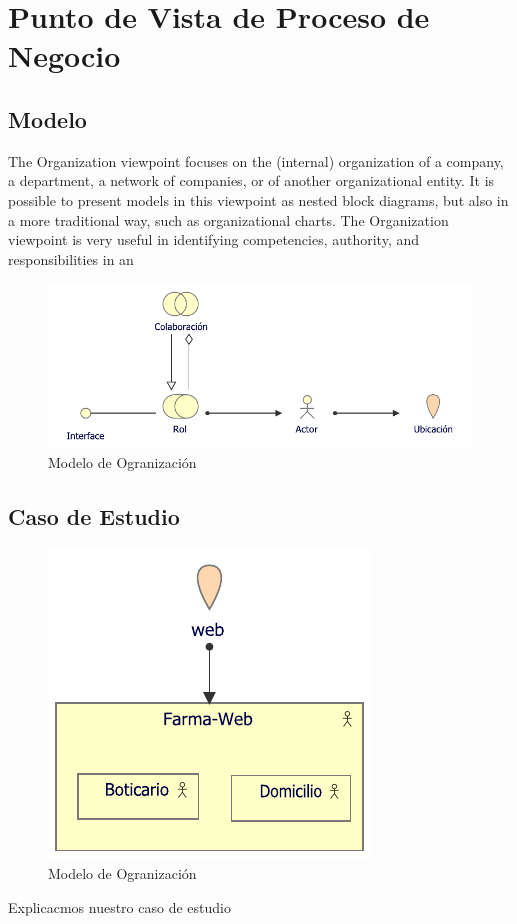 \section{Punto de Vista de Proceso de Negocio}
\subsection{Modelo}
The Organization viewpoint focuses on the (internal) organization of a company, a department, a network of companies, or of another organizational entity. It is possible to present models in this viewpoint as nested block diagrams, but also in a more traditional way, such as organizational charts. The Organization viewpoint is very useful in identifying competencies, authority, and responsibilities in an

\begin{figure}[h!]
	\centering
	\includegraphics[width=1\linewidth]{ARQUITECTURA/imgs/MOrganizacion}
	\caption{Modelo de Ogranización}
\end{figure}


\newpage
\subsection{Caso de Estudio}

\begin{figure}[h!]
	\centering
	\includegraphics[width=.5\linewidth]{ARQUITECTURA/imgs/COrganizacion}
	\caption{Modelo de Ogranización}
\end{figure}
Explicacmos nuestro caso de estudio
\newpage
